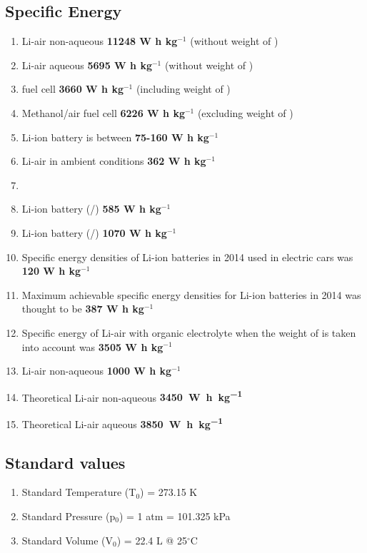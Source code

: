 \documentclass[12pt]{book}
\begin{document}
\subsection{Specific Energy}
\begin{enumerate}
	\item [\cite{Crowther2011}] Li-air non-aqueous \textbf{11248 W h kg$^{-1}$} (without weight of )
	\item [\cite{Wang2010a}] Li-air aqueous \textbf{5695 W h kg$^{-1}$} (without weight of )
	\item [\cite{Wang2010a}]  fuel cell \textbf{3660 W h kg$^{-1}$} (including weight of )
	\item [\cite{Wang2010a}] Methanol/air fuel cell \textbf{6226 W h kg$^{-1}$} (excluding weight of )
	\item [\cite{Wakihara2001}] Li-ion battery is between \textbf{75-160 W h kg$^{-1}$}
	\item [\cite{Capsoni2012}] Li-air in ambient conditions \textbf{362 W h kg$^{-1}$} 
	\item [\cite{Aetukuri2015}] 
	\item [\cite{Albertus2011}] Li-ion battery (/) \textbf{585 W h kg$^{-1}$}
	\item [\cite{Albertus2011}] Li-ion battery (/) \textbf{1070 W h kg$^{-1}$}
	\item [\cite{Bardenhagen2015}] Specific energy densities of Li-ion batteries in 2014 used in electric cars was \textbf{120 W h kg$^{-1}$}
	\item [\cite{Bardenhagen2015}] Maximum achievable specific energy densities for Li-ion batteries in 2014 was thought to be \textbf{387 W h kg$^{-1}$}
	\item [\cite{Bardenhagen2015}] Specific energy of Li-air with organic electrolyte when the weight of  is taken into account was \textbf{3505 W h kg$^{-1}$}
	\item [\cite{Wang2014}] Li-air non-aqueous \textbf{1000 W h kg$^{-1}$} 
	\item [\cite{Visco2014}] Theoretical Li-air non-aqueous \textbf{3450~\si[detect-weight=true]{\watt\hour\per\kilogram}}
	\item [\cite{Visco2014}] Theoretical Li-air aqueous \textbf{3850~\si[detect-weight=true]{\watt\hour\per\kilogram}}
\end{enumerate}
\subsection{Standard values}
\begin{enumerate}
	\item Standard Temperature (T$_0$) = 273.15 K
	\item Standard Pressure (p$_0$) = 1 atm = 101.325 kPa
	\item Standard Volume (V$_0$) = 22.4 L @ 25$^\circ$C 
\end{enumerate}
\end{document}

